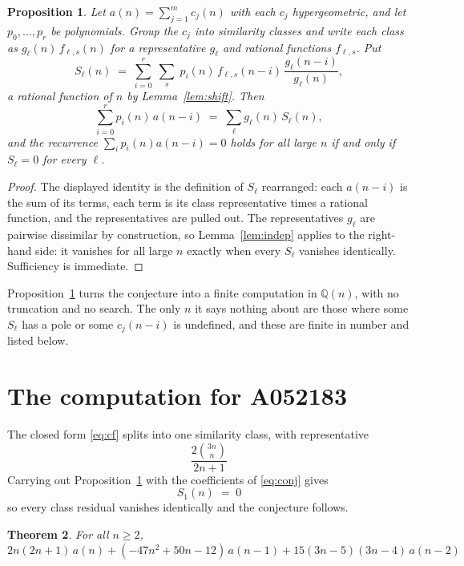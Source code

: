 \documentclass[11pt,a4paper]{article}
\theoremstyle{plain}
\newtheorem{theorem}{Theorem}
\newtheorem{proposition}[theorem]{Proposition}
\theoremstyle{definition}
\begin{document}
\begin{proposition}\label{prop:main}
Let $a(n)=\sum_{j=1}^{m}c_{j}(n)$ with each $c_{j}$ hypergeometric, and let
$p_{0},\dots,p_{r}$ be polynomials. Group the $c_{j}$ into similarity classes and write
each class as $g_{\ell}(n)\,f_{\ell,s}(n)$ for a representative $g_{\ell}$ and rational
functions $f_{\ell,s}$. Put
\[
S_{\ell}(n)\;=\;\sum_{i=0}^{r}\;\sum_{s}\;p_{i}(n)\,f_{\ell,s}(n-i)\,
\frac{g_{\ell}(n-i)}{g_{\ell}(n)} ,
\]
a rational function of $n$ by Lemma~\ref{lem:shift}. Then
\[
\sum_{i=0}^{r}p_{i}(n)\,a(n-i)\;=\;\sum_{\ell}g_{\ell}(n)\,S_{\ell}(n),
\]
and the recurrence $\sum_{i}p_{i}(n)a(n-i)=0$ holds for all large $n$ if and only if
$S_{\ell}=0$ for every $\ell$.
\end{proposition}

\begin{proof}
The displayed identity is the definition of $S_{\ell}$ rearranged: each $a(n-i)$ is the
sum of its terms, each term is its class representative times a rational function, and the
representatives are pulled out. The representatives $g_{\ell}$ are pairwise dissimilar by
construction, so Lemma~\ref{lem:indep} applies to the right-hand side: it vanishes for all
large $n$ exactly when every $S_{\ell}$ vanishes identically. Sufficiency is immediate.
\end{proof}

Proposition~\ref{prop:main} turns the conjecture into a finite computation in
$\mathbb{Q}(n)$, with no truncation and no search. The only $n$ it says nothing about are
those where some $S_{\ell}$ has a pole or some $c_{j}(n-i)$ is undefined, and these are
finite in number and listed below.

\section{The computation for A052183}

The closed form \eqref{eq:cf} splits into one similarity class, with
representative
\[
\frac{2 {\binom{3 n}{n}}}{2 n + 1}
\]
Carrying out Proposition~\ref{prop:main} with the coefficients of \eqref{eq:conj} gives
\[
S_{1}(n)\;=\;0
\]
so every class residual vanishes identically and the conjecture follows.

\begin{theorem}
For all $n\ge 2$,
\[
2 n \left(2 n + 1\right)\,a(n) + (- 47 n^{2} + 50 n - 12)\,a(n-1) + 15 \left(3 n - 5\right) \left(3 n - 4\right)\,a(n-2)
\]
\end{theorem}
\end{document}
